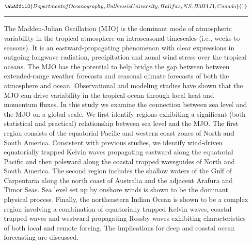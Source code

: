 \begin{minipage}{\linewidth}\begin{center}\begin{minipage}{\linewidth}
   \vspace{2 mm} \begin{center}
    \vspace{2 mm}\begin{center}
  
  $\abAffilO{Department of Oceanography, Dalhousie University, Halifax, NS, B3H 4J1, Canada}{1}$

  \end{center}
  \vspace{2 mm}
  \end{center}\end{minipage}\end{center}
  \begin{center}\rule{0.70\linewidth}{0.5 pt}\end{center}
  \begin{minipage}{\linewidth}
\noindent The Madden-Julian Oscillation (MJO) is the dominant mode of atmospheric variability in the tropical atmosphere on intraseasonal timescales (i.e., weeks to seasons).  It is an eastward-propagating phenomenon with clear expressions in outgoing longwave radiation, precipitation and zonal wind stress over the tropical oceans.  The MJO has the potential to help bridge the gap between between extended-range weather forecasts and seasonal climate forecasts of both the atmosphere and ocean.  Observational and modeling studies have shown that the MJO can drive variability in the tropical ocean through local heat and momentum fluxes. In this study we examine the connection between sea level and the MJO on a global scale. We first identify regions exhibiting a significant (both statistical and practical) relationship between sea level and the MJO. The first region consists of the equatorial Pacific and western coast zones of North and South America. Consistent with previous studies, we identify wind-driven equatorially trapped Kelvin waves propagating eastward along the equatorial Pacific and then poleward along the coastal trapped waveguides of North and South America.  The second region includes the shallow waters of the Gulf of Carpentaria along the north coast of Australia and the adjacent Arafura and Timor Seas. Sea level set up by onshore winds is shown to be the dominant physical process. Finally, the northeastern Indian Ocean is shown to be a complex region involving a combination of equatorially trapped Kelvin waves, coastal trapped waves and westward propagating Rossby waves exhibiting characteristics of both local and remote forcing. The implications for deep and coastal ocean forecasting are discussed.
\end{minipage}\end{minipage}
